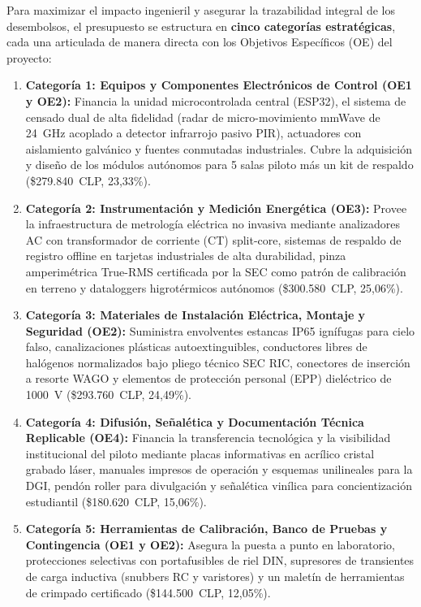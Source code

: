 Para maximizar el impacto ingenieril y asegurar la trazabilidad integral de los desembolsos, el presupuesto se estructura en \textbf{cinco categorías estratégicas}, cada una articulada de manera directa con los Objetivos Específicos (OE) del proyecto:
\begin{enumerate}
    \item \textbf{Categoría 1: Equipos y Componentes Electrónicos de Control (OE1 y OE2):} Financia la unidad microcontrolada central (ESP32), el sistema de censado dual de alta fidelidad (radar de micro-movimiento mmWave de 24~GHz acoplado a detector infrarrojo pasivo PIR), actuadores con aislamiento galvánico y fuentes conmutadas industriales. Cubre la adquisición y diseño de los módulos autónomos para 5 salas piloto más un kit de respaldo (\$279.840~CLP, 23,33\%).
    \item \textbf{Categoría 2: Instrumentación y Medición Energética (OE3):} Provee la infraestructura de metrología eléctrica no invasiva mediante analizadores AC con transformador de corriente (CT) split-core, sistemas de respaldo de registro offline en tarjetas industriales de alta durabilidad, pinza amperimétrica True-RMS certificada por la SEC como patrón de calibración en terreno y dataloggers higrotérmicos autónomos (\$300.580~CLP, 25,06\%).
    \item \textbf{Categoría 3: Materiales de Instalación Eléctrica, Montaje y Seguridad (OE2):} Suministra envolventes estancas IP65 ignífugas para cielo falso, canalizaciones plásticas autoextinguibles, conductores libres de halógenos normalizados bajo pliego técnico SEC RIC, conectores de inserción a resorte WAGO y elementos de protección personal (EPP) dieléctrico de 1000~V (\$293.760~CLP, 24,49\%).
    \item \textbf{Categoría 4: Difusión, Señalética y Documentación Técnica Replicable (OE4):} Financia la transferencia tecnológica y la visibilidad institucional del piloto mediante placas informativas en acrílico cristal grabado láser, manuales impresos de operación y esquemas unilineales para la DGI, pendón roller para divulgación y señalética vinílica para concientización estudiantil (\$180.620~CLP, 15,06\%).
    \item \textbf{Categoría 5: Herramientas de Calibración, Banco de Pruebas y Contingencia (OE1 y OE2):} Asegura la puesta a punto en laboratorio, protecciones selectivas con portafusibles de riel DIN, supresores de transientes de carga inductiva (snubbers RC y varistores) y un maletín de herramientas de crimpado certificado (\$144.500~CLP, 12,05\%).
\end{enumerate}

